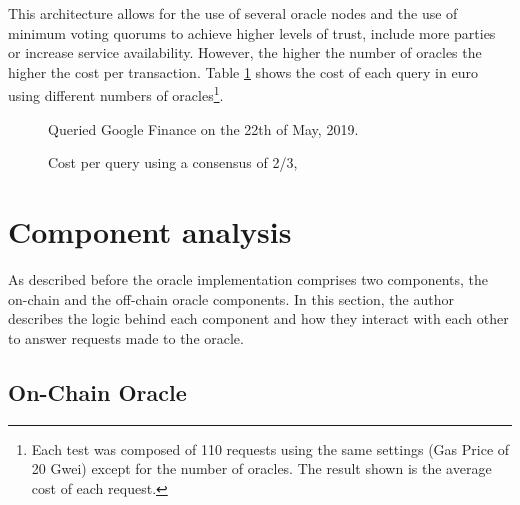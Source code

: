 This architecture allows for the use of several oracle nodes and the use of minimum voting quorums to achieve higher levels of trust, include more parties or increase service availability. However, the higher the number of oracles the higher the cost per transaction. Table \ref{oracle-query-cost} shows the cost of each query in euro using different numbers of oracles\footnote{Each test was composed of 110 requests using the same settings (Gas Price of 20 Gwei) except for the number of oracles. The result shown is the average cost of each request.}.


\begin{figure}[H]
    \centering
    \caption{Cost per query using a consensus of 2/3,}{Queried Google Finance on the 22th of May, 2019.}
    \
    \label{oracle-query-cost}
\end{figure}

\section{Component analysis}

As described before the oracle implementation comprises two components, the on-chain and the off-chain oracle components. In this section, the author describes the logic behind each component and how they interact with each other to answer requests made to the oracle.


\subsection{On-Chain Oracle}

